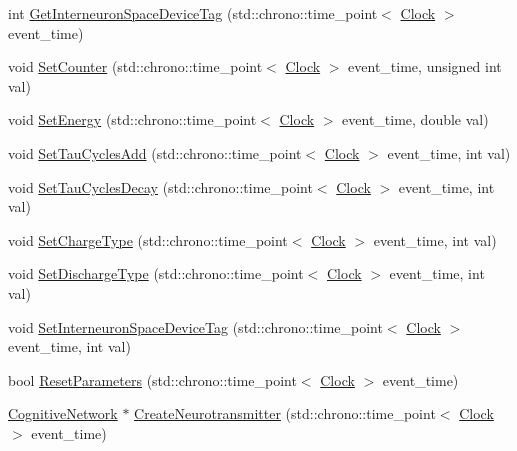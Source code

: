 \begin{DoxyCompactItemize}
\item 
int \hyperlink{class_interneuron_space_a66b6683bab6872dfece6111a8ccfb1d7}{Get\+Interneuron\+Space\+Device\+Tag} (std\+::chrono\+::time\+\_\+point$<$ \hyperlink{universe_8h_a0ef8d951d1ca5ab3cfaf7ab4c7a6fd80}{Clock} $>$ event\+\_\+time)
\item 
void \hyperlink{class_interneuron_space_a60a46f22a2e575d65031635a698a60a9}{Set\+Counter} (std\+::chrono\+::time\+\_\+point$<$ \hyperlink{universe_8h_a0ef8d951d1ca5ab3cfaf7ab4c7a6fd80}{Clock} $>$ event\+\_\+time, unsigned int val)
\item 
void \hyperlink{class_interneuron_space_a65ecd1914ab039707313beb1b8702e68}{Set\+Energy} (std\+::chrono\+::time\+\_\+point$<$ \hyperlink{universe_8h_a0ef8d951d1ca5ab3cfaf7ab4c7a6fd80}{Clock} $>$ event\+\_\+time, double val)
\item 
void \hyperlink{class_interneuron_space_ad6c1387daa261a3e8e1dba1402101d5c}{Set\+Tau\+Cycles\+Add} (std\+::chrono\+::time\+\_\+point$<$ \hyperlink{universe_8h_a0ef8d951d1ca5ab3cfaf7ab4c7a6fd80}{Clock} $>$ event\+\_\+time, int val)
\item 
void \hyperlink{class_interneuron_space_a7f44a965e377ecdc5c387af2b5d30d69}{Set\+Tau\+Cycles\+Decay} (std\+::chrono\+::time\+\_\+point$<$ \hyperlink{universe_8h_a0ef8d951d1ca5ab3cfaf7ab4c7a6fd80}{Clock} $>$ event\+\_\+time, int val)
\item 
void \hyperlink{class_interneuron_space_a404aacb1adce30288bb7b4237344e4cc}{Set\+Charge\+Type} (std\+::chrono\+::time\+\_\+point$<$ \hyperlink{universe_8h_a0ef8d951d1ca5ab3cfaf7ab4c7a6fd80}{Clock} $>$ event\+\_\+time, int val)
\item 
void \hyperlink{class_interneuron_space_a7fc404aae98d45ccad26b5c186fab6e2}{Set\+Discharge\+Type} (std\+::chrono\+::time\+\_\+point$<$ \hyperlink{universe_8h_a0ef8d951d1ca5ab3cfaf7ab4c7a6fd80}{Clock} $>$ event\+\_\+time, int val)
\item 
void \hyperlink{class_interneuron_space_ab34d72ef9135288690328217d7c0a388}{Set\+Interneuron\+Space\+Device\+Tag} (std\+::chrono\+::time\+\_\+point$<$ \hyperlink{universe_8h_a0ef8d951d1ca5ab3cfaf7ab4c7a6fd80}{Clock} $>$ event\+\_\+time, int val)
\item 
bool \hyperlink{class_interneuron_space_a3a9776e4a77b87374204468ca7974157}{Reset\+Parameters} (std\+::chrono\+::time\+\_\+point$<$ \hyperlink{universe_8h_a0ef8d951d1ca5ab3cfaf7ab4c7a6fd80}{Clock} $>$ event\+\_\+time)
\item 
\hyperlink{class_cognitive_network}{Cognitive\+Network} $\ast$ \hyperlink{class_interneuron_space_a26d98a0ae78ce363ab93e92cf0c973e7}{Create\+Neurotransmitter} (std\+::chrono\+::time\+\_\+point$<$ \hyperlink{universe_8h_a0ef8d951d1ca5ab3cfaf7ab4c7a6fd80}{Clock} $>$ event\+\_\+time)

\end{DoxyCompactItemize}

